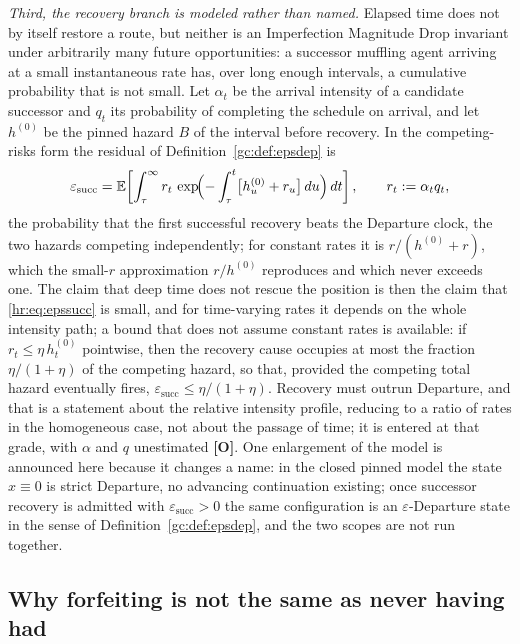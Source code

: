 \begin{remark}
\emph{Third, the recovery branch is modeled rather than named.} Elapsed
time does not by itself restore a route, but neither is an Imperfection
Magnitude Drop invariant under arbitrarily many future opportunities: a
successor muffling agent arriving at a small instantaneous rate has,
over long enough intervals, a cumulative probability that is not small.
Let $\alpha_t$ be the arrival intensity of a candidate successor and
$q_t$ its probability of completing the schedule on arrival, and let
$h^{(0)}$ be the pinned hazard $B$ of the interval before
recovery. In the competing-risks form the residual of
Definition~\ref{gc:def:epsdep} is
\begin{equation}\label{hr:eq:epssucc}
\varepsilon_{\mathrm{succ}}
=\mathbb{E}\!\left[\int_\tau^\infty r_t\,
\exp\!\Bigl(-\int_\tau^t\bigl[h^{(0)}_u+r_u\bigr]\,du\Bigr)\,dt\right],
\qquad r_t:=\alpha_tq_t,
\end{equation}
the probability that the first successful recovery beats the Departure
clock, the two hazards competing independently; for constant rates it
is $r/(h^{(0)}+r)$, which the small-$r$ approximation $r/h^{(0)}$
reproduces and which never exceeds one. The claim that deep time does
not rescue the position is then the claim that \eqref{hr:eq:epssucc}
is small, and for time-varying rates it depends on the whole intensity
path; a bound that does not assume constant rates is available: if
$r_t\le\eta\,h^{(0)}_t$ pointwise, then the recovery cause occupies at
most the fraction $\eta/(1+\eta)$ of the competing hazard, so that,
provided the competing total hazard eventually fires,
$\varepsilon_{\mathrm{succ}}\le\eta/(1+\eta)$. Recovery must outrun
Departure, and that is a statement about the relative intensity profile,
reducing to a ratio of rates in the homogeneous case, not about the
passage of time; it is entered at that grade, with $\alpha$ and $q$
unestimated \textbf{[O]}. One enlargement of the model is
announced here because it changes a name: in the closed pinned model
the state $x\equiv0$ is strict Departure, no advancing continuation
existing; once successor recovery is admitted with
$\varepsilon_{\mathrm{succ}}>0$ the same configuration is an
$\varepsilon$-Departure state in the sense of
Definition~\ref{gc:def:epsdep}, and the two scopes are not run
together.\end{remark}

\subsection{Why forfeiting is not the same as never having had}
\label{hr:subsub:stakes}

